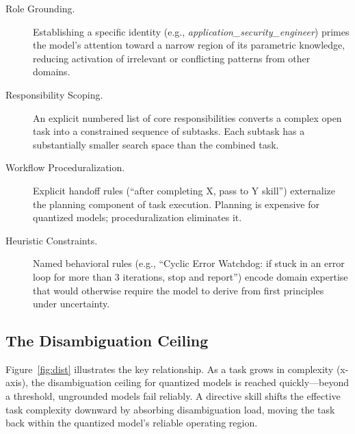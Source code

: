 \documentclass[11pt,a4paper]{article}
\begin{document}
\begin{description}
  \item[Role Grounding.] Establishing a specific identity (e.g.,
  \textit{application\_security\_engineer}) primes the model's attention toward
  a narrow region of its parametric knowledge, reducing activation of
  irrelevant or conflicting patterns from other domains.

  \item[Responsibility Scoping.] An explicit numbered list of core
  responsibilities converts a complex open task into a constrained sequence
  of subtasks. Each subtask has a substantially smaller search space than
  the combined task.

  \item[Workflow Proceduralization.] Explicit handoff rules (``after
  completing X, pass to Y skill'') externalize the planning component of
  task execution. Planning is expensive for quantized models; proceduralization
  eliminates it.

  \item[Heuristic Constraints.] Named behavioral rules (e.g., ``Cyclic Error
  Watchdog: if stuck in an error loop for more than 3 iterations, stop and
  report'') encode domain expertise that would otherwise require the model to
  derive from first principles under uncertainty.
\end{description}

\subsection{The Disambiguation Ceiling}

Figure~\ref{fig:dist} illustrates the key relationship. As a task grows in
complexity (x-axis), the disambiguation ceiling for quantized models is
reached quickly—beyond a threshold, ungrounded models fail reliably. A
directive skill shifts the effective task complexity downward by absorbing
disambiguation load, moving the task back within the quantized model's
reliable operating region.
\end{document}
